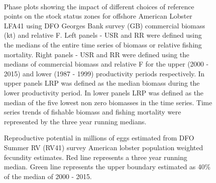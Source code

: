 \documentclass[11pt]{article}
\newcommand{\e}{/backup/bio_data/bio.lobster/figures/} %
\begin{document}
\begin{landscape}
\begin{figure}
\centering
        \\
     
      \caption{Phase plots showing the impact of different choices of reference points on the stock status zones for offshore American Lobster LFA41 using DFO Georges Bank survey (GB) commercial biomass (kt) and relative F. Left panels  - USR and RR were defined using the medians of the entire time series of biomass or relative fishing mortality. Right panels - USR and RR were defined using the medians of commercial biomass and relative F for the upper (2000 - 2015) and lower (1987 - 1999) productivity periods respectively. In upper panels LRP was defined as the median biomass during the lower productivity period. In lower panels LRP was defined as the median of the five lowest non zero biomasses in the time series. Time series trends of fishable biomass and fishing mortality were represented by the three year running medians. }


\end{figure}
\end{landscape}
     \clearpage

\begin{figure}

\centering
\caption{Reproductive potential in millions of eggs estimated from DFO Summer RV (RV41) survey American lobster population weighted fecundity estimates. Red line represents a three year running median. Green line represents the upper boundary estimated as 40\% of the median of 2000 - 2015. }
\end{figure}
\end{document}
